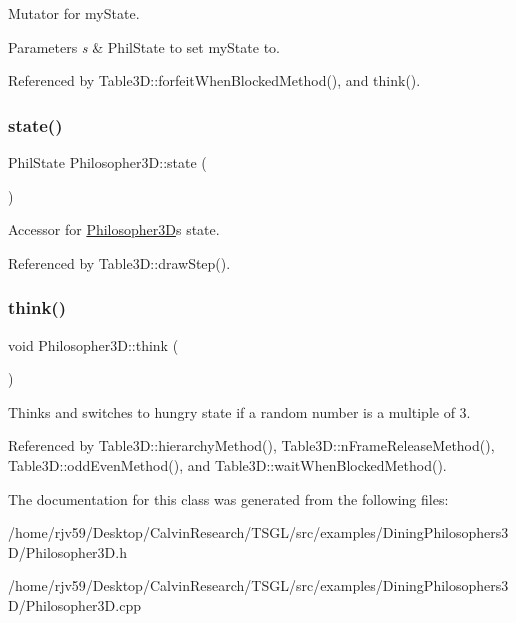 Mutator for my\+State. 


\begin{DoxyParams}{Parameters}
{\em s} & Phil\+State to set my\+State to. \\
\hline
\end{DoxyParams}


Referenced by Table3\+D\+::forfeit\+When\+Blocked\+Method(), and think().

\mbox{\label{class_philosopher3_d_a515fb48855cd2a9421c13d6097953a10}} 
\subsubsection{\texorpdfstring{state()}{state()}}
{\footnotesize\ttfamily Phil\+State Philosopher3\+D\+::state (\begin{DoxyParamCaption}{ }\end{DoxyParamCaption})\hspace{0.3cm}{\ttfamily [inline]}}

Accessor for \hyperlink{class_philosopher3_d}{Philosopher3D}\textquotesingle{}s state. 

Referenced by Table3\+D\+::draw\+Step().

\mbox{\label{class_philosopher3_d_a586456ca9cc859018aa47564f235c933}} 
\subsubsection{\texorpdfstring{think()}{think()}}
{\footnotesize\ttfamily void Philosopher3\+D\+::think (\begin{DoxyParamCaption}{ }\end{DoxyParamCaption})}

Thinks and switches to hungry state if a random number is a multiple of 3. 

Referenced by Table3\+D\+::hierarchy\+Method(), Table3\+D\+::n\+Frame\+Release\+Method(), Table3\+D\+::odd\+Even\+Method(), and Table3\+D\+::wait\+When\+Blocked\+Method().



The documentation for this class was generated from the following files\+:\begin{DoxyCompactItemize}
\item 
/home/rjv59/\+Desktop/\+Calvin\+Research/\+T\+S\+G\+L/src/examples/\+Dining\+Philosophers3\+D/Philosopher3\+D.\+h\item 
/home/rjv59/\+Desktop/\+Calvin\+Research/\+T\+S\+G\+L/src/examples/\+Dining\+Philosophers3\+D/Philosopher3\+D.\+cpp\end{DoxyCompactItemize}
